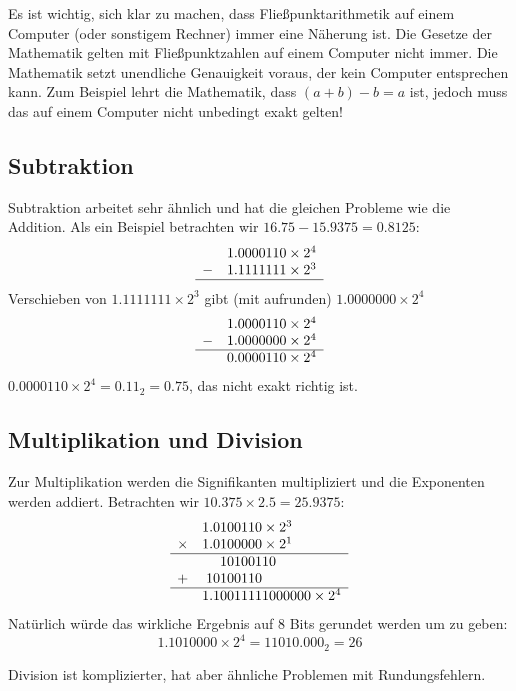 Es ist wichtig, sich klar zu machen, dass Flie{\ss}punktarithmetik auf
einem Computer (oder sonstigem Rechner) immer eine N\"{a}herung ist. Die
Gesetze der Mathematik gelten mit Flie{\ss}punktzahlen auf einem
Computer nicht immer. Die Mathematik setzt unendliche Genauigkeit
voraus, der kein Computer entsprechen kann. Zum Beispiel lehrt die
Mathematik, dass $(a + b) - b = a$ ist, jedoch muss das auf einem
Computer nicht unbedingt exakt gelten!

\subsection{Subtraktion}
Subtraktion arbeitet sehr \"{a}hnlich und hat die gleichen Probleme wie
die Addition. Als ein Beispiel betrachten wir $16.75 - 15.9375 =
0.8125$:
\[
\begin{array}{rr}
  & 1.0000110 \times 2^4 \\
 -& 1.1111111 \times 2^3 \\ \hline
\end{array}
\]
Verschieben von $1.1111111 \times 2^3$ gibt (mit aufrunden)
$1.0000000 \times 2^4$
\[
\begin{array}{rr}
  & 1.0000110 \times 2^4 \\
 -& 1.0000000 \times 2^4 \\ \hline
  & 0.0000110 \times 2^4
\end{array}
\]
$0.0000110 \times 2^4 = 0.11_2 = 0.75$, das nicht exakt richtig ist.

\subsection{Multiplikation und Division}

Zur Multiplikation werden die Signifikanten multipliziert und die
Exponenten werden addiert. Betrachten wir $10.375 \times 2.5 =
25.9375$:
\[
\begin{array}{rr@{}l}
  &  1.0&100110 \times 2^3 \\
 \times &  1.0&100000 \times 2^1 \\ \hline
  &     &10100110 \\
 +&   10&100110   \\ \hline
  &   1.1&0011111000000 \times 2^4
\end{array}
\]
Nat\"{u}rlich w\"{u}rde das wirkliche Ergebnis auf 8 Bits gerundet werden um
zu geben:
\[1.1010000 \times 2^4 = 11010.000_2 = 26 \]

Division ist komplizierter, hat aber \"{a}hnliche Problemen mit
Rundungsfehlern.

